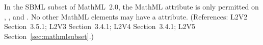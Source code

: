 In the SBML subset of MathML~2.0, the MathML attribute
 is only permitted on , ,
and .  No other
MathML elements may have a  attribute.  (References:
L2V2 Section~3.5.1; L2V3 Section~3.4.1; L2V4 Section~3.4.1; L2V5 Section~\ref{sec:mathmlsubset}.)
